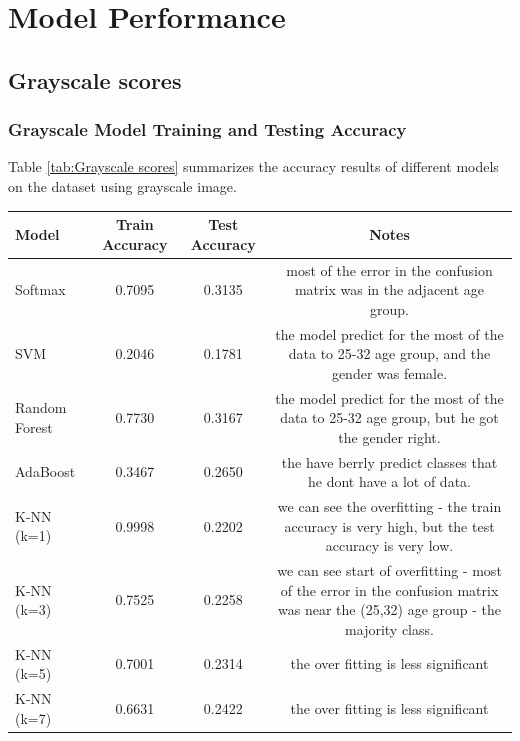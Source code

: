 \documentclass{article}
\begin{document}
\newpage
\section{Model Performance}
\subsection{Grayscale scores}

\subsubsection{Grayscale Model Training and Testing Accuracy}
Table \ref{tab:Grayscale scores} summarizes the accuracy results of different models on the dataset using grayscale image.

\begin{table}[htbp]
    \centering
    \begin{tabular}{lccc}
        \toprule
        Model & Train Accuracy & Test Accuracy & Notes \\
        \toprule
        Softmax & 0.7095 & 0.3135 & \parbox[t]{6cm}{most of the error in the confusion matrix was in the adjacent age group.} \\
        \midrule
        SVM & 0.2046 & 0.1781 & \parbox[t]{6cm}{the model predict for the most of the data to 25-32 age group, and the gender was female.} \\
        \midrule
        Random Forest & 0.7730 & 0.3167 & \parbox[t]{6cm}{the model predict for the most of the data to 25-32 age group, but he got the gender right.} \\
        \midrule
        AdaBoost & 0.3467 & 0.2650 & \parbox[t]{6cm}{the  have berrly predict classes that he dont have a lot of data.} \\
        \midrule
        K-NN (k=1) & 0.9998 & 0.2202 & \parbox[t]{6cm}{we can see the overfitting -  the train accuracy is very high, but the test accuracy is very low.} \\
        \midrule
        K-NN (k=3) & 0.7525 & 0.2258 & \parbox[t]{6cm}{we can see start of overfitting - most of the error in the confusion matrix was near the (25,32) age group - the majority class.}\\
        \midrule
        K-NN (k=5) & 0.7001 & 0.2314 & \parbox[t]{6cm}{the over fitting is less significant}\\
        \midrule
        K-NN (k=7) & 0.6631 & 0.2422 & \parbox[t]{6cm}{the over fitting is less significant} \\

\end{tabular}
\end{table}
\end{document}
